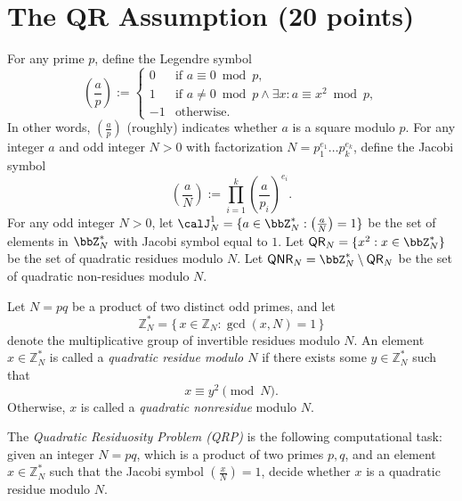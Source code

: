 \documentclass{article}
\begin{document}
\newpage
\section{The QR Assumption (20 points)}
\newcommand{\Rerand}{\mathsf{Rerand}}
\newcommand{\GM}{\mathsf{GM}}
\newcommand{\rk}{\mathsf{rk}}
\newcommand{\supp}{\mathsf{Supp}}
\newcommand{\QR}{\mathsf{QR}}
\newcommand{\QNR}{\mathsf{QNR}}
\newcommand{\Primes}{\mathsf{Primes}}

For any prime $p$, define the Legendre symbol
    \[ \left(\frac{a}{p}\right) := \begin{cases} 0 & \text{if } a \equiv 0 \bmod{p}, \\ 1 & \text{if } a \neq 0 \bmod{p} \land \exists x: a \equiv x^2 \bmod{p}, \\ -1 & \text{otherwise.} \end{cases} \]
In other words, $(\frac{a}{p})$ (roughly) indicates whether $a$ is a square modulo $p$. For any integer $a$ and odd integer $N > 0$ with factorization $N = p_1^{e_1} \ldots p_k^{e_k}$, define the Jacobi symbol
    \[ \left(\frac{a}{N}\right) := \prod_{i=1}^k \left(\frac{a}{p_i}\right)^{e_i}. \]
For any odd integer $N > 0$, let $\calJ_{N}^1 = \{ a \in \bbZ_N^{*} : \left(\frac{a}{N}\right) = 1\}$ be the set of elements in $\bbZ_N^{*}$ with Jacobi symbol equal to $1$. 
Let $\QR_N = \{x^2 : x \in \bbZ_N^{*}\}$ be the set of quadratic residues modulo $N$. Let $\QNR_N = \bbZ_N^{*} \setminus \QR_N$ be the set of quadratic non-residues modulo $N$.

\begin{definition}
Let $N = pq$ be a product of two distinct odd primes, and let 
\[
\mathbb{Z}_N^* = \{\, x \in \mathbb{Z}_N : \gcd(x, N) = 1 \,\}
\]
denote the multiplicative group of invertible residues modulo $N$.
An element $x \in \mathbb{Z}_N^*$ is called a \emph{quadratic residue modulo $N$}
if there exists some $y \in \mathbb{Z}_N^*$ such that
\[
x \equiv y^2 \pmod{N}.
\]
Otherwise, $x$ is called a \emph{quadratic nonresidue} modulo $N$.

\smallskip
The \emph{Quadratic Residuosity Problem (QRP)} is the following computational task: given an integer $N = pq$, which is a product of two primes $p,q$, and an element $x \in \mathbb{Z}_N^*$ such that the Jacobi symbol $\left( \frac{x}{N} \right) = 1$, decide whether $x$ is a quadratic residue modulo $N$.
\end{definition}
\end{document}
